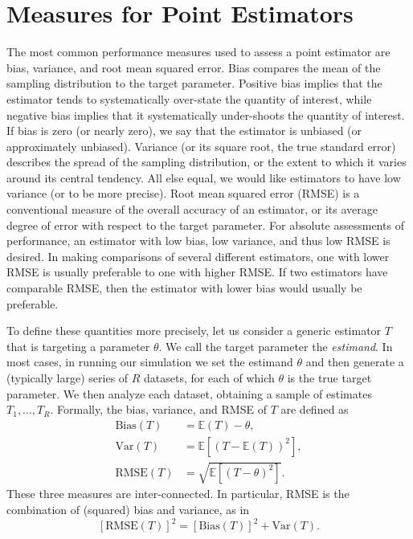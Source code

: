 \documentclass[
]{book}
\newcommand{\E}{\mathbb{E}}
\newcommand{\Var}{\text{Var}}
\newcommand{\Bias}{\text{Bias}}
\newcommand{\RMSE}{\text{RMSE}}
\begin{document}
\section{Measures for Point Estimators}\label{assessing-point-estimators}

The most common performance measures used to assess a point estimator are bias, variance, and root mean squared error.
Bias compares the mean of the sampling distribution to the target parameter.
Positive bias implies that the estimator tends to systematically over-state the quantity of interest, while negative bias implies that it systematically under-shoots the quantity of interest.
If bias is zero (or nearly zero), we say that the estimator is unbiased (or approximately unbiased).
Variance (or its square root, the true standard error) describes the spread of the sampling distribution, or the extent to which it varies around its central tendency.
All else equal, we would like estimators to have low variance (or to be more precise).
Root mean squared error (RMSE) is a conventional measure of the overall accuracy of an estimator, or its average degree of error with respect to the target parameter.
For absolute assessments of performance, an estimator with low bias, low variance, and thus low RMSE is desired.
In making comparisons of several different estimators, one with lower RMSE is usually preferable to one with higher RMSE.
If two estimators have comparable RMSE, then the estimator with lower bias would usually be preferable.

To define these quantities more precisely, let us consider a generic estimator \(T\) that is targeting a parameter \(\theta\).
We call the target parameter the \emph{estimand}.
In most cases, in running our simulation we set the estimand \(\theta\) and then generate a (typically large) series of \(R\) datasets, for each of which \(\theta\) is the true target parameter.
We then analyze each dataset, obtaining a sample of estimates \(T_1,...,T_R\).
Formally, the bias, variance, and RMSE of \(T\) are defined as
\[
\begin{aligned}
\Bias(T) &= \E(T) - \theta, \\ 
\Var(T) &= \E\left[\left(T - \E (T)\right)^2 \right], \\
\RMSE(T) &= \sqrt{\E\left[\left(T - \theta\right)^2 \right]}.
\end{aligned}
\label{eq:bias-variance-RMSE}
\]
These three measures are inter-connected.
In particular, RMSE is the combination of (squared) bias and variance, as in
\[ 
\left[\RMSE(T)\right]^2 = \left[\Bias(T)\right]^2 + \Var(T). 
\label{eq:RMSE-decomposition}
\]
\end{document}
